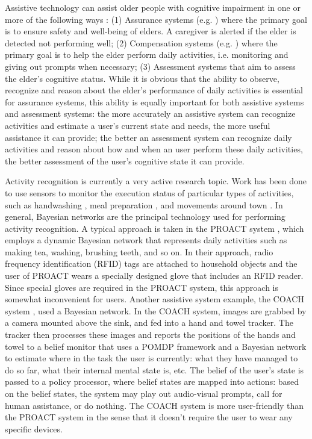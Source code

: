 Assistive technology can assist older people with cognitive impairment in one or more of the following ways \cite{pollack2005intelligent}: (1) Assurance systems (e.g. \cite{hoey2012lacasa}) where the primary goal is to ensure safety and well-being of elders. A caregiver is alerted if the elder is detected not performing well; (2) Compensation systems (e.g. \cite{boger2005decision, peters2014automatic, hoey2010automated}) where the primary goal is to help the elder perform daily activities, i.e. monitoring and giving out prompts when necessary; (3) Assessment systems that aim to assess the elder's cognitive status. While it is obvious that the ability to observe, recognize and reason about the elder's performance of daily activities is essential for assurance systems, this ability is equally important for both assistive systems and assessment systems: the more accurately an assistive system can recognize activities and estimate a user's current state and needs, the more useful assistance it can provide; the better an assessment system can recognize daily activities and reason about how and when an user perform these daily activities, the better assessment of the user's cognitive state it can provide.

Activity recognition is currently a very active research topic. Work has been done to use sensors to monitor the execution status of particular types of activities, such as handwashing \cite{hoey2010automated}, meal preparation \cite{philipose2004inferring}, and movements around town \cite{hoey2012lacasa}. In general, Bayesian networks are the principal technology used for performing activity recognition. A typical approach is taken in the PROACT system \cite{philipose2004inferring}, which employs a dynamic Bayesian network that represents daily activities such as making tea, washing, brushing teeth, and so on. In their approach, radio frequency identification (RFID) tags are attached to household objects and the user of PROACT wears a specially designed glove that includes an RFID reader. Since special gloves are required in the PROACT system, this approach is somewhat inconvenient for users. Another assistive system example, the COACH system \cite{boger2005decision, hoey2010automated}, used a Bayesian network. In the COACH system, images are grabbed by a camera mounted above the sink, and fed into a hand and towel tracker. The tracker then processes these images and reports the positions of the hands and towel to a belief monitor that uses a POMDP framework and a Bayesian network to estimate where in the task the user is currently: what they have managed to do so far, what their internal mental state is, etc. The belief of the user's state is passed to a policy processor, where belief states are mapped into actions: based on the belief states, the system may play out audio-visual prompts, call for human assistance, or do nothing. The COACH system is more user-friendly than the PROACT system in the sense that it doesn't require the user to wear any specific devices.

